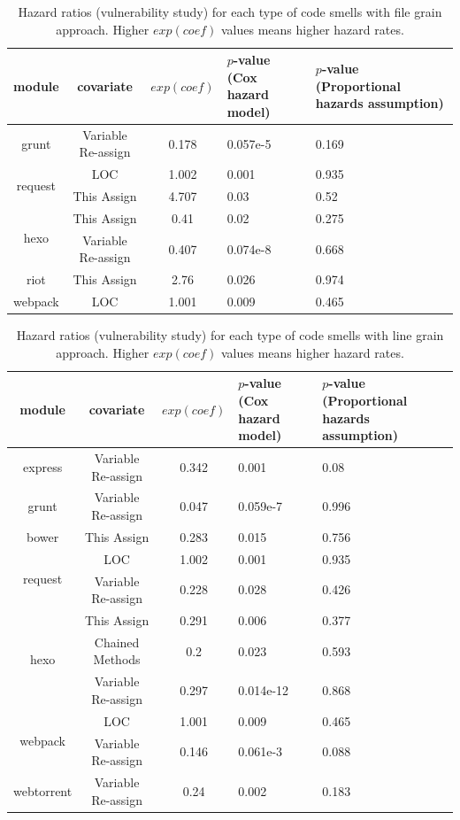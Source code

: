 {\begin{table}[t]
	\centering
	\scriptsize
	\caption{Hazard ratios (vulnerability study) for each type of code smells with file grain approach. Higher $exp(coef)$ values means higher hazard rates.}
	\begin{tabular}{c|c|c|p{2cm}|p{2cm}}
		\hline
		module & covariate & $exp(coef)$ & $p$-value (Cox hazard model) & $p$-value (Proportional hazards assumption) \\ \hline
		\multirow{1}{*}{grunt} 
		& Variable Re-assign & 0.178 & 0.057e-5 & 0.169 \\ \hline
		\multirow{2}{*}{request}
		& LOC & 1.002 & 0.001 & 0.935 \\ \cline{2-5}
		& This Assign & 4.707 & 0.03 & 0.52 \\ \hline
		\multirow{2}{*}{hexo}
		& This Assign & 0.41 & 0.02 & 0.275 \\ \cline{2-5}
		& Variable Re-assign & 0.407 & 0.074e-8 & 0.668 \\ \hline
		\multirow{1}{*}{riot}
		& This Assign & 2.76 & 0.026 & 0.974 \\ \hline
		\multirow{1}{*}{webpack}
		& LOC & 1.001 & 0.009 & 0.465 \\ \hline
	\end{tabular}
	\label{smelltypes4}

\end{table}

\begin{table}[t]
	\centering
	\scriptsize
	\caption{Hazard ratios (vulnerability study) for each type of code smells with line grain approach. Higher $exp(coef)$ values means higher hazard rates.}
	\begin{tabular}{c|c|c|p{2cm}|p{2cm}}
		\hline
		module & covariate & $exp(coef)$ & $p$-value (Cox hazard model) & $p$-value (Proportional hazards assumption) \\ \hline
		\multirow{1}{*}{express}
		& Variable Re-assign & 0.342 & 0.001 & 0.08  \\ \hline
		\multirow{1}{*}{grunt} 
		& Variable Re-assign & 0.047 & 0.059e-7 & 0.996 \\ \hline
		\multirow{1}{*}{bower}
		& This Assign & 0.283 & 0.015 & 0.756 \\ \hline
		\multirow{2}{*}{request}
		& LOC & 1.002 & 0.001 & 0.935 \\ \cline{2-5}
		& Variable Re-assign & 0.228 & 0.028 & 0.426 \\ \hline
		\multirow{3}{*}{hexo}
		& This Assign & 0.291 & 0.006 & 0.377 \\ \cline{2-5}
		& Chained Methods & 0.2 & 0.023 & 0.593 \\ \cline{2-5}
		& Variable Re-assign & 0.297 & 0.014e-12 & 0.868 \\ \hline
		\multirow{2}{*}{webpack}
		& LOC & 1.001 & 0.009 & 0.465 \\ \cline{2-5}
		& Variable Re-assign & 0.146 & 0.061e-3 & 0.088 \\ \hline
		\multirow{1}{*}{webtorrent}
		& Variable Re-assign & 0.24 & 0.002 & 0.183 \\ \hline
	\end{tabular}
	\label{smelltypes5}


\end{table}}
